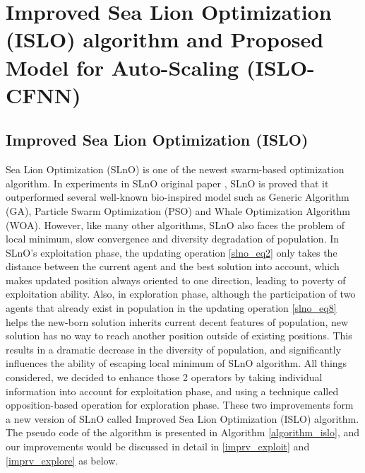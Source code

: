 \documentclass[a4paper,13pt,2p]{report}
\begin{document}
\chapter{Improved Sea Lion Optimization (ISLO) algorithm and Proposed Model for Auto-Scaling (ISLO-CFNN)}
\section{Improved Sea Lion Optimization (ISLO)}
\label{improved_ISLO}
	Sea Lion Optimization (SLnO) is one of the newest swarm-based optimization algorithm. In experiments in SLnO original paper \cite{masadeh2019sea}, SLnO is proved that it outperformed several well-known bio-inspired model such as Generic Algorithm (GA), Particle Swarm Optimization (PSO) and Whale Optimization Algorithm (WOA). However, like many other algorithms, SLnO also faces the problem of local minimum, slow convergence and diversity degradation of population. In SLnO's exploitation phase, the updating operation \ref{slno_eq2} only takes the distance between the current agent and the best solution into account, which makes updated position always oriented to one direction, leading to poverty of exploitation ability. Also, in exploration phase, although the participation of two agents that already exist in population in the updating operation \ref{slno_eq8} helps the new-born solution inherits current decent features of population, new solution has no way to reach another position outside of existing positions. This results in a dramatic decrease in the diversity of population, and significantly influences the ability of escaping local minimum of SLnO algorithm. All things considered, we decided to enhance those 2 operators by taking individual information into account for exploitation phase, and using a technique called opposition-based operation for exploration phase. These two improvements form a new version of SLnO called Improved Sea Lion Optimization (ISLO) algorithm. The pseudo code of the algorithm is presented in Algorithm \ref{algorithm_islo}, and  our improvements would be discussed in detail in \ref{imprv_exploit} and \ref{imprv_explore} as below.  
\end{document}
